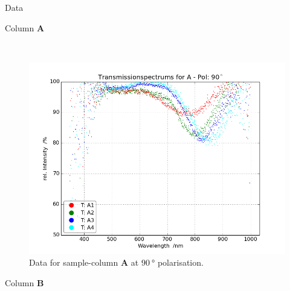 \begin{appendix}
\begin{chapter}{Data}
\begin{section}{Column \textbf{A}}
\begin{figure}[ht!]
\begin{minipage}{.92\textwidth}
        \end{minipage}\\
        \begin{minipage}{.92\textwidth}
          \centering
          \includegraphics[width=\textwidth]{Figures/TransspecRAW_APol90.png}
          \caption{Data for sample-column \textbf{A} at $\SI{90}{\degree}$
              polarisation.}
          \label{fig:TransspecRAW_APol90}
        \end{minipage}
      \end{figure}
      
    \end{section}
    
    
    
    \newpage
    \begin{section}{Column \textbf{B}}
      \label{Appendix:DataB}
      

\end{section}
\end{chapter}
\end{appendix}
